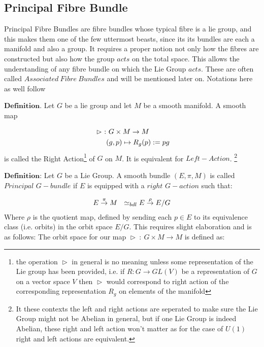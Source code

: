 \documentclass[8pt, twocoloumn]{article}
\begin{document}
\subsection{Principal Fibre Bundle}
Principal Fibre Bundles are fibre bundles whose typical fibre is a lie group, and this makes them one of the few uttermost beasts, since its its bundles are each a manifold and also a group. It requires a proper notion not only how the fibres are constructed but also how the group $acts$ on the total space. This allows the understanding of any fibre bundle on which the Lie Group $acts$. These are often called $Associated \ Fibre \ Bundles$ and will be mentioned later on. Notations here as well follow

$\textbf{Definition.}$ Let $G$ be a lie group and let $M$ be a smooth manifold. A smooth map

\begin{align}{\label{rightaction}}
\vartriangleright  \ :&  \ G \times M \to M \\ 
& (g, p) \mapsto R_g(p) := p g 
\end{align}
is called the Right Action\footnote{the operation $\vartriangleright$ in general is no meaning unless some representation of the Lie group has been provided, i.e. if $R : G \to GL(V)$ be a representation of $G$ on a vector space $V$ then $\vartriangleright$ would correspond to right action of the corresponding representation $R_g$ on elements of the manifold} of $G$ on $M$. It is equivalent for $Left-Action$. \footnote{It these contexts the left and right actions are seperated to make sure the Lie Group might not be Abelian in general, but if one Lie Group is indeed Abelian, these right and left action won't matter as for the case of $U(1)$ right and left actions are equivalent.}

$\textbf{Definition:}$ Let $G$ be a Lie Group. A smooth bundle $(E, \pi, M)$ is called $Principal$ $G-bundle$ if $E$ is equipped with a $right$ $G-action$ such that:

\begin{align}{\label{principalfibrebundledefinition}}
E \overset{\pi}{\to} M  \ \ \simeq_{bdl} E \overset{\rho}{\to} E /G
\end{align}
Where $\rho$ is the quotient map, defined by sending each $p \in E$ to its equivalence class (i.e. orbits) in the orbit space $E/G$. This requires slight elaboration and is as follows: The orbit space for our map $\vartriangleright  \ : \ G \times M \to M $ is defined as:
\end{document}

